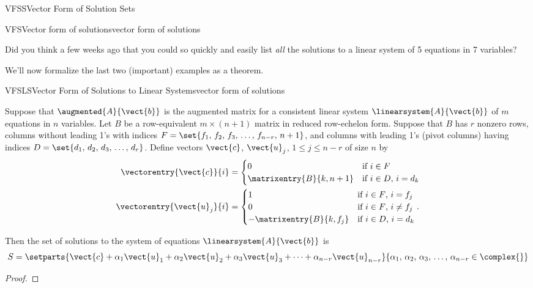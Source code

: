 \begin{subsect}{VFSS}{Vector Form of Solution Sets}
\begin{example}{VFS}{Vector form of solutions}{vector form of solutions}
%
\end{example}
%
\begin{para}Did you think a few weeks ago that you could so quickly and easily list {\em all} the solutions to a linear system of 5 equations in 7 variables?\end{para}
%
\begin{para}We'll now formalize the last two (important) examples as a theorem.\end{para}
%
\begin{theorem}{VFSLS}{Vector Form of Solutions to Linear Systems}{vector form of solutions}
\begin{para}Suppose that $\augmented{A}{\vect{b}}$ is the augmented matrix for a consistent linear system $\linearsystem{A}{\vect{b}}$ of $m$ equations in $n$ variables.
Let $B$ be a row-equivalent $m\times (n+1)$ matrix in reduced row-echelon form. Suppose that $B$ has $r$ nonzero rows,  columns without leading 1's with indices $F=\set{f_1,\,f_2,\,f_3,\,\ldots,\,f_{n-r},\,n+1}$, and columns with leading 1's (pivot columns) having indices $D=\set{d_1,\,d_2,\,d_3,\,\ldots,\,d_r}$.  Define vectors $\vect{c}$, $\vect{u}_j$, $1\leq j\leq n-r$ of size $n$ by
%
\begin{align*}
\vectorentry{\vect{c}}{i}&=
\begin{cases}
0&\text{if $i\in F$}\\
\matrixentry{B}{k,n+1}&\text{if $i\in D$, $i=d_k$}
\end{cases}\\
\vectorentry{\vect{u}_j}{i}&=
\begin{cases}
1&\text{if $i\in F$, $i=f_j$}\\
0&\text{if $i\in F$, $i\neq f_j$}\\
-\matrixentry{B}{k,f_j}&\text{if $i\in D$, $i=d_k$}
\end{cases}.
\end{align*}\end{para}
%
\begin{para}Then the set of solutions to the system of equations $\linearsystem{A}{\vect{b}}$ is
%
\begin{equation*}
S=\setparts{
\vect{c}+\alpha_1\vect{u}_1+\alpha_2\vect{u}_2+\alpha_3\vect{u}_3+\cdots+\alpha_{n-r}\vect{u}_{n-r}
}{
\alpha_1,\,\alpha_2,\,\alpha_3,\,\ldots,\,\alpha_{n-r}\in\complex{\null}
}
\end{equation*}\end{para}
%
\end{theorem}
%
\begin{proof}

\end{proof}
\end{subsect}
